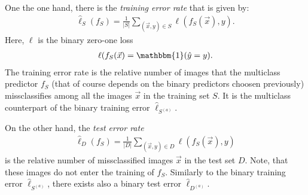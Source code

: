 One the one hand, there is the \textit{training error rate} that is given by:
\begin{align}\label{eq:training_error}
	\hat{\ell}_{S}(f_S) = \frac{1}{|S|} \sum_{(\vec{x}, y) \in S} \ell(f_S(\vec{x}), y).
\end{align}
Here, $\ell$ is the binary zero-one loss
\begin{align*}
	\ell(f_S(\vec{x}) = \mathbbm{1}(\hat{y} = y).
\end{align*}
The training error rate is the relative number of images that the multiclass predictor $f_S$ (that of course depends on the binary predictors choosen previously) missclassifies among all the images $\vec{x}$ in the training set $S$. It is the multiclass counterpart of the binary training error $\hat{\ell}_{S^{(a)}}$.

On the other hand, the \textit{test error rate}
\begin{align}\label{eq:test_error}
	\hat{\ell}_{D}(f_S) = \frac{1}{|D|} \sum_{(\vec{x}, y) \in D} \ell(f_S(\vec{x}), y)
\end{align}
is the relative number of missclassified images $\vec{x}$ in the test set $D$. Note, that these images do not enter the training of $f_S$. Similarly to the binary training error $\hat{\ell}_{S^{(a)}}$, there exists also a binary test error $\hat{\ell}_{D^{(a)}}$.